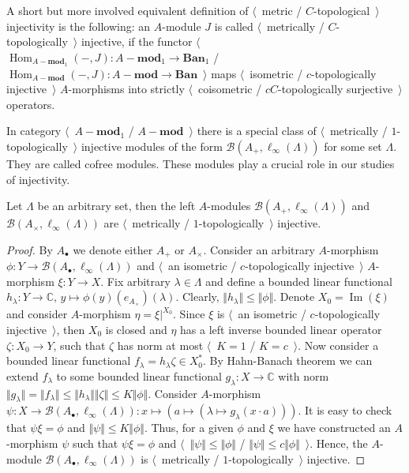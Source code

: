 A short but more involved equivalent definition 
of $\langle$~metric / $C$-topological~$\rangle$ injectivity is the following: 
an $A$-module $J$ is called $\langle$~metrically / $C$-topologically~$\rangle$ 
injective, if the functor
$\langle$~$\operatorname{Hom}_{A-\mathbf{mod}_1}(-,J)
:A-\mathbf{mod}_1\to\mathbf{Ban}_1$
/
$\operatorname{Hom}_{A-\mathbf{mod}}(-,J)
:A-\mathbf{mod}\to\mathbf{Ban}$~$\rangle$
maps $\langle$~isometric / $c$-topologically injective~$\rangle$
$A$-morphisms into strictly $\langle$~coisometric / 
$c C$-topologically surjective~$\rangle$ operators. 

In category $\langle$~$A-\mathbf{mod}_1$ / $A-\mathbf{mod}$~$\rangle$ there
is a special class of $\langle$~metrically / $1$-topologically~$\rangle$
injective modules of the form $\mathcal{B}(A_+, \ell_\infty(\Lambda))$ for 
some set $\Lambda$. They are called cofree modules. These modules play a crucial 
role in our studies of injectivity.

\begin{proposition}\label{MetCTopCofreeMod} Let $\Lambda$ be an arbitrary 
set, then the left $A$-modules $\mathcal{B}(A_+, \ell_\infty(\Lambda))$ 
and $\mathcal{B}(A_\times, \ell_\infty(\Lambda))$
are $\langle$~metrically / $1$-topologically~$\rangle$ injective. 
\end{proposition}
\begin{proof} By $A_\bullet$ we denote either $A_+$ or $A_\times$.
Consider an arbitrary $A$-morphism 
$\phi:Y\to \mathcal{B}(A_\bullet, \ell_\infty(\Lambda))$ and 
$\langle$~an isometric / $c$-topologically injective~$\rangle$ 
$A$-morphism $\xi:Y\to X$. Fix arbitrary $\lambda\in\Lambda$ and define 
a bounded linear functional 
$h_\lambda:Y\to\mathbb{C},\, y\mapsto \phi(y)(e_{A_\times})(\lambda)$. 
Clearly, $\Vert h_\lambda\Vert\leq\Vert \phi\Vert$.
Denote $X_0=\operatorname{Im}(\xi)$ and consider 
$A$-morphism $\eta=\xi|^{X_0}$. Since $\xi$ is 
$\langle$~an isometric / $c$-topologically injective~$\rangle$, then $X_0$ is
closed and $\eta$ has a left inverse bounded linear operator $\zeta:X_0\to Y$, 
such that $\zeta$ has norm at most $\langle$~$K=1$ / $K=c$~$\rangle$. 
Now consider a bounded linear functional  $f_\lambda=h_\lambda\zeta\in X_0^*$. 
By Hahn-Banach theorem we can extend $f_\lambda$ to some bounded linear functional
$g_\lambda:X\to\mathbb{C}$ with norm  
$\Vert g_\lambda\Vert
=\Vert f_\lambda\Vert
\leq\Vert h_\lambda\Vert\Vert\zeta\Vert
\leq K\Vert \phi\Vert$. 
Consider $A$-morphism 
$\psi
:X\to \mathcal{B}(A_\bullet, \ell_\infty(\Lambda))
:x\mapsto (a\mapsto (\lambda\mapsto g_\lambda(x\cdot a)))$. 
It is easy to check that $\psi\xi=\phi$ and 
$\Vert\psi\Vert\leq K\Vert\phi\Vert$. Thus, for a given $\phi$ 
and $\xi$ we have constructed an $A$-morphism $\psi$ such that $\psi\xi=\phi$ 
and $\langle$~$\Vert\psi\Vert\leq\Vert\phi\Vert$ /
$\Vert\psi\Vert\leq c\Vert\phi\Vert$~$\rangle$. Hence, the 
$A$-module $\mathcal{B}(A_\bullet, \ell_\infty(\Lambda))$ is 
$\langle$~metrically / $1$-topologically~$\rangle$ injective.
\end{proof}


